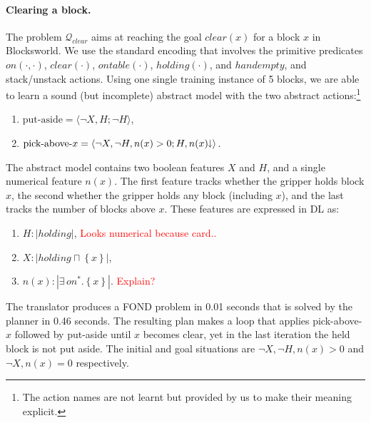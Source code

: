 \documentclass[letterpaper]{article} %
\newcommand{\tup}[1]{\langle #1 \rangle}
\newcommand{\set}[1]{\ensuremath{\left\{#1 \right\}}}
\newcommand{\abs}[1]{\ensuremath{\left\vert{#1}\right\vert}}
\newcommand{\Q}{\mathcal{Q}}
\newcommand{\abst}[2]{\tup{#1;#2}}
\newcommand{\mminus}{\hspace{-.05em}\raisebox{.15ex}{\footnotesize$\downarrow$}}
\begin{document}
\paragraph{Clearing a block.}
The problem $\Q_{clear}$ aims at reaching the goal $clear(x)$ for a
block $x$ in Blocksworld. We use the standard encoding that involves
the primitive predicates $on(\cdot,\cdot)$, $clear(\cdot)$,
$ontable(\cdot)$, $holding(\cdot)$, and $handempty$, and stack/unstack
actions.
Using one single training instance of 5 blocks, we are able to learn
a sound (but incomplete) abstract model with the two abstract
actions:\footnote{The action names are not learnt but provided by us
  to make their meaning explicit.}
\begin{enumerate}[--]
  \item $\text{put-aside} = \abst{\neg X, H}{\neg H}$,
  \item $\text{pick-above-$x$} = \abst{\neg X, \neg H, n(x) > 0}{H, n(x)\mminus}$.
\end{enumerate}
The abstract model contains two boolean features $X$ and $H$, and
a single numerical feature $n(x)$. 
The first feature tracks whether the gripper holds block $x$, the
second whether the gripper holds any block (including $x$), and the
last tracks the number of blocks above $x$.
These features are expressed in DL as:
\begin{enumerate}[--]
  \item $H: \abs{holding}$, \textcolor{red}{Looks numerical because card..}
  \item $X: \abs{holding \sqcap \set{x}}$,
  \item $n(x): \abs{\exists\,on^* . \set{x}}$. \textcolor{red}{Explain?}
\end{enumerate}

The translator produces a FOND problem in 0.01 seconds that is solved
by the planner in 0.46 seconds.
The resulting plan makes a loop that applies pick-above-$x$ followed
by put-aside until $x$ becomes clear, yet in the last iteration the
held block is not put aside. The initial and goal situations are
$\neg X,\neg H,n(x)>0$ and $\neg X,n(x)=0$ respectively.


% 

%
\end{document}
